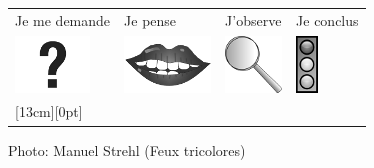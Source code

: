 \documentclass[12pt,a4paper,landscape]{article}
\begin{document}
\Huge

\newcommand{\largeur}{5cm}

\begin{tabularx}{\textwidth}{%
>{\centering\arraybackslash}p{\largeur}
|>{\centering\arraybackslash}X
|>{\centering\arraybackslash}X
|>{\centering\arraybackslash}p{\largeur}
}
Je me demande & Je pense & J’observe & Je conclus \\ 
\includegraphics{te1.png}& 
\includegraphics{te2.png}& 
\includegraphics{te3.png}& 
\includegraphics{te4.png}\\ 
\hline 
\raisebox{0pt}[13cm][0pt] &  &  &  \\ 
\end{tabularx}
\tiny\vfill\hfill Photo: Manuel Strehl (Feux tricolores)
\end{document}
